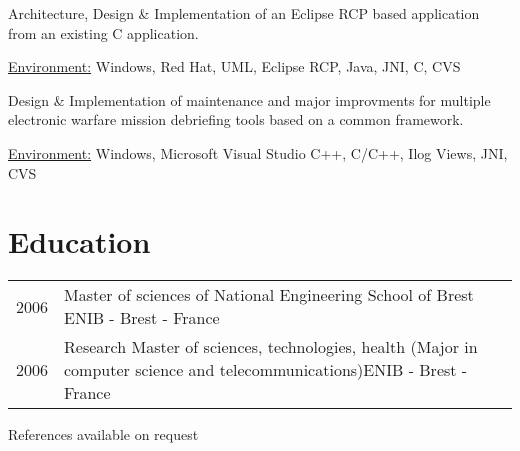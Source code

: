 \documentclass[10pt,letterpaper]{resume/resume}
\begin{document}
\begin{minipage}[t]{\linewidth}
\par Architecture, Design \& Implementation of an Eclipse RCP based application from an existing C application.
\par\underline{Environment:} Windows, Red Hat, UML, Eclipse RCP, Java, JNI, C, CVS

\par Design \& Implementation of maintenance and major improvments for multiple electronic warfare mission debriefing tools based on a common framework.
\par\underline{Environment:} Windows, Microsoft Visual Studio C++, C/C++, Ilog Views, JNI, CVS
%
%
  \end{minipage}

  \begin{minipage}[t]{\linewidth}
    \section{Education}
      \begin{tabularx}{\linewidth}{lX}%
        2006 & Master of sciences of National Engineering School of Brest \hfill ENIB - Brest - France\\ 
        2006 & Research Master of sciences, technologies, health (Major in computer science and telecommunications)\hfill ENIB - Brest - France\\
      \end{tabularx}%
  \end{minipage}

  \vfill
  \begin{center}References available on request\end{center}
\end{document}
